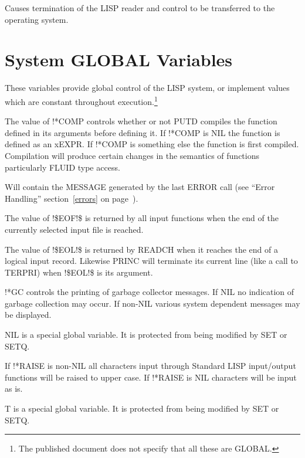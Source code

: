 {Causes termination of the LISP reader and control to be transferred
to the operating system.}

\section{System GLOBAL Variables}
\label{slglobals}

These variables provide global control of the LISP system, or
implement values which are constant throughout execution.\footnote{The
published document does not specify that all these are GLOBAL.}


{The value of !*COMP controls whether or not PUTD compiles the
function defined in its arguments before defining it. If !*COMP is NIL
the function is defined as an xEXPR. If !*COMP is something else the
function is first compiled. Compilation will produce certain changes
in the semantics of functions particularly FLUID type access.}


{Will contain the MESSAGE generated by the last ERROR call (see
``Error Handling'' section~\ref{errors} on page~\pageref{errors}).}


{The value of !\$EOF!\$ is returned by all input functions when the
end
of the currently selected input file is reached.}


{The value of !\$EOL!\$ is returned by READCH when it reaches the end
of
  
a logical input record. Likewise PRINC will terminate its current line
(like a call to TERPRI) when !\$EOL!\$ is its argument.}

{!*GC controls the printing of garbage collector messages.  If NIL no
indication of garbage collection may occur.  If non-NIL various system
dependent messages may be displayed.}


{NIL is a special global variable. It is protected from being modified
by SET or SETQ.
}


{If !*RAISE is non-NIL all characters input through Standard LISP
input/output functions will be raised to upper case. If !*RAISE is NIL
characters will be input as is.}


{T is a special global variable. It is protected from being modified
by SET or SETQ. }


